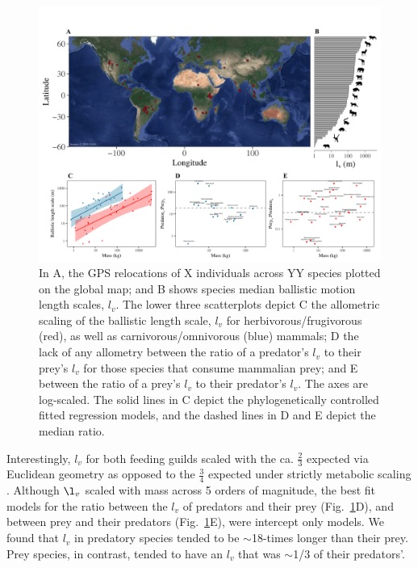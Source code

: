 \documentclass[12pt]{article}
\begin{document}
\begin{figure}[!h]
\centering
\includegraphics[scale=0.9]{Figure_2}
\caption{In A, the GPS relocations of X individuals across YY species plotted on the global map; and B shows species median ballistic motion length scales, $l_v$. The lower three scatterplots depict C the allometric scaling of the ballistic length scale, $l_v$ for herbivorous/frugivorous (red), as well as carnivorous/omnivorous (blue) mammals; D the lack of any allometry between the ratio of a predator's $l_v$ to their prey's $l_v$ for those species that consume mammalian prey; and E between the ratio of a prey's $l_v$ to their predator's $l_v$. The axes are log-scaled. The solid lines in C depict the phylogenetically controlled fitted regression models, and the dashed lines in D and E depict the median ratio.}
\label{fig:emp_res}
\end{figure}


Interestingly, $l_v$ for both feeding guilds scaled with the ca. $\frac{2}{3}$ expected via Euclidean geometry as opposed to the $\frac{3}{4}$ expected under strictly metabolic scaling \cite{Brown:2004}. Although $\l_v$ scaled with mass across 5 orders of magnitude, the best fit models for the ratio between the $l_v$ of predators and their prey (Fig.~\ref{fig:emp_res}D), and between prey and their predators (Fig.~\ref{fig:emp_res}E), were intercept only models. We found that $l_v$ in predatory species tended to be $\sim$18-times longer than their prey. Prey species, in contrast, tended to have an $l_v$ that was $\sim$1/3 of their predators'. 

\end{document}
